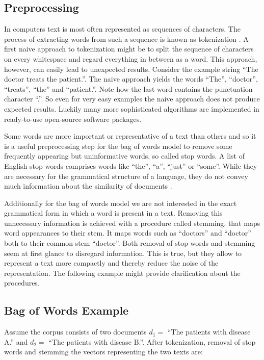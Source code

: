 \subsection*{Preprocessing}
In computers text is most often represented as sequences of characters. The process of extracting words from such a sequence is known as tokenization \citep{Manning2008prepr}. A first naive approach to tokenization might be to
split the sequence of characters on every whitespace and regard everything
in between as a word. This approach, however, can easily lead to unexpected
results. Consider the example string ``The doctor treats the patient.''. The naive
approach yields the words ``The'', ``doctor'', ``treats'', ``the'' and ``patient.''.
Note how the last word contains the punctuation character ``.''.
So even for very easy examples the naive approach does not produce
expected results. Luckily many more sophisticated algorithms are implemented
in ready-to-use open-source software packages.

Some words are more important or representative of a text than others and so it is a useful preprocessing step for the bag of words model to remove some frequently appearing but uninformative words, so called stop words. A list of English stop words comprises words like ``the'', ``a'', ``just'' or ``some''.  While they are necessary for the
grammatical structure of a language, they do not convey much information
about the similarity of documents \citep{Manning2008prepr}.

Additionally for the bag of words model we are not interested in the exact grammatical form in which a word is present in a text. Removing this unnecessary information is achieved with a procedure called stemming, that maps word appearances to their stem. It maps words such as ``doctors'' and ``doctor'' both to their common stem ``doctor''. Both removal of stop words and stemming seem at first glance to disregard information. This is true, but they allow to represent a text more compactly and thereby reduce the noise of the representation. The following example might provide clarification about the procedures.

\subsection*{Bag of Words Example}
Assume the corpus
consists of two documents $d_{1}=$ ``The patients with disease A.'' and $d_{2}=$ ``The patients with disease B.''. After tokenization, removal of stop words and stemming the vectors representing the two texts are:

